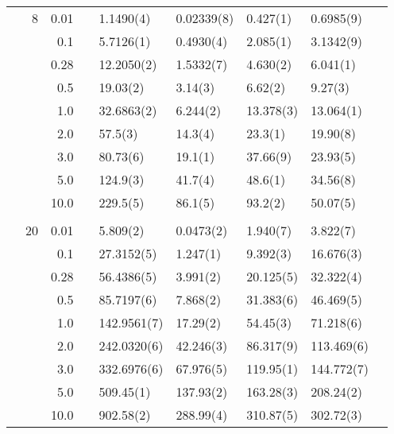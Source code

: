 \begin{table}[H]
\begin{tabularx}{\textwidth}{R{1cm}rrcR{2.3cm}R{2.3cm}R{2.3cm}R{2.3cm}R{1cm}}
		&8 & 0.01 && 1.1490(4) & 0.02339(8) & 0.427(1) & 0.6985(9) \\
		&& 0.1 && 5.7126(1) & 0.4930(4) & 2.085(1) & 3.1342(9) \\
		&& 0.28 && 12.2050(2) & 1.5332(7) & 4.630(2) & 6.041(1) \\
		&& 0.5 && 19.03(2) & 3.14(3) & 6.62(2) & 9.27(3) \\
		&& 1.0 && 32.6863(2) & 6.244(2) & 13.378(3) & 13.064(1) \\
		&& 2.0 && 57.5(3) & 14.3(4) & 23.3(1) & 19.90(8) \\
		&& 3.0 && 80.73(6) & 19.1(1) & 37.66(9) & 23.93(5) \\ 
		&& 5.0 && 124.9(3) & 41.7(4) & 48.6(1) & 34.56(8) \\
		&& 10.0 && 229.5(5) & 86.1(5) & 93.2(2) & 50.07(5) \\
		\hdashline \\
		
		&20 & 0.01 && 5.809(2) & 0.0473(2) & 1.940(7) & 3.822(7) \\
		&& 0.1 && 27.3152(5) & 1.247(1) & 9.392(3) & 16.676(3) \\
		&& 0.28 && 56.4386(5) & 3.991(2) & 20.125(5) & 32.322(4) \\
		&& 0.5 && 85.7197(6) & 7.868(2) & 31.383(6) & 46.469(5) \\
		&& 1.0 && 142.9561(7) & 17.29(2) & 54.45(3) & 71.218(6) \\
		&& 2.0 && 242.0320(6) & 42.246(3) & 86.317(9) & 113.469(6) \\
		&& 3.0 && 332.6976(6) & 67.976(5) & 119.95(1) & 144.772(7) \\ 
		&& 5.0 && 509.45(1) & 137.93(2) & 163.28(3) & 208.24(2) \\
		&& 10.0 && 902.58(2) & 288.99(4) & 310.87(5) & 302.72(3) \\
		\hline \hline
	\end{tabularx}
\end{table}

